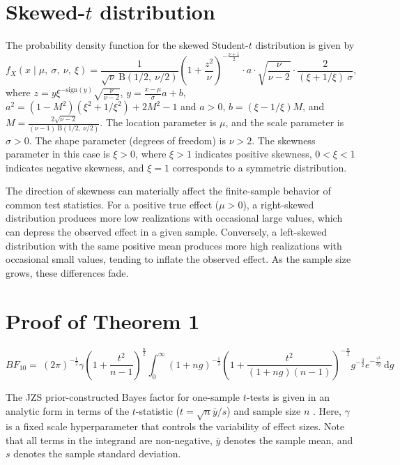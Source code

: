 \documentclass[preprint,12pt,authoryear]{elsarticle}
\begin{document}

\section{Skewed-$t$ distribution}
\label{app2}

The probability density function for the skewed Student-$t$ distribution is given by
\begin{equation*}
	f_X(x\mid\mu,\ \sigma,\ \nu,\ \xi)=\frac{1}{\sqrt{\nu}\ \text{B}(1/2,\ \!\nu/2)}\left(1+\frac{z^2}{\nu}\right)^{-\frac{\nu+1}{2}}\cdot a\cdot\sqrt{\frac{\nu}{\nu-2}}\cdot\frac{2}{(\xi+1/\xi)\ \sigma},
\end{equation*}
where $z=y\xi^{-\mathrm{sign}(y)}\sqrt{\frac{\nu}{\nu-2}}$, $y=\frac{x-\mu}{\sigma}a+b$, $a^2=(1-M^2)(\xi^2+1/\xi^2)+2M^2-1$ and $a>0$, $b=(\xi-1/\xi)M$, and $M=\frac{2\sqrt{\nu-2}}{(\nu-1)\ \text{B}(1/2,\ \!\nu/2)}$. The location parameter is $\mu$, and the scale parameter is $\sigma>0$. The shape parameter (degrees of freedom) is $\nu>2$. The skewness parameter in this case is $\xi>0$, where $\xi>1$ indicates positive skewness, $0<\xi<1$ indicates negative skewness, and $\xi=1$ corresponds to a symmetric distribution.

The direction of skewness can materially affect the finite-sample behavior of common test statistics. For a positive true effect ($\mu>0$), a right-skewed distribution produces more low realizations with occasional large values, which can depress the observed effect in a given sample. Conversely, a left-skewed distribution with the same positive mean produces more high realizations with occasional small values, tending to inflate the observed effect. As the sample size grows, these differences fade.


\section{Proof of Theorem 1}
\label{app3}

{\footnotesize
\begin{equation*}
	\mathit{BF}_{10}=\ (2\pi)^{-\frac{1}{2}}\gamma\left(1+\frac{t^2}{n-1}\right)^{\frac{n}{2}}\int_0^\infty(1+ng)^{-\frac{1}{2}}\left(1+\frac{t^2}{(1+ng)(n-1)}\right)^{-\frac{n}{2}}\!g^{-\frac{3}{2}}e^{-\frac{\gamma^2}{2g}}\ \!\mathrm{d}g
\end{equation*}
}

The JZS prior-constructed Bayes factor for one-sample $t$-tests is given in an analytic form in terms of the $t$-statistic ($t=\sqrt{n}\bar{y}/s$) and sample size $n$ \citetext{%
	\citealp[p.~24]{ly_harold_2016}; %
	\citealp[p.~237]{rouder_bayesian_2009}; %
	\citealp[p.~360]{rouder_default_2012}; %
	\citealp[p.~1762]{wei_investigating_2023}}.
Here, $\gamma$ is a fixed scale hyperparameter that controls the variability of effect sizes. Note that all terms in the integrand are non-negative, $\bar{y}$ denotes the sample mean, and $s$ denotes the sample standard deviation.
\end{document}
